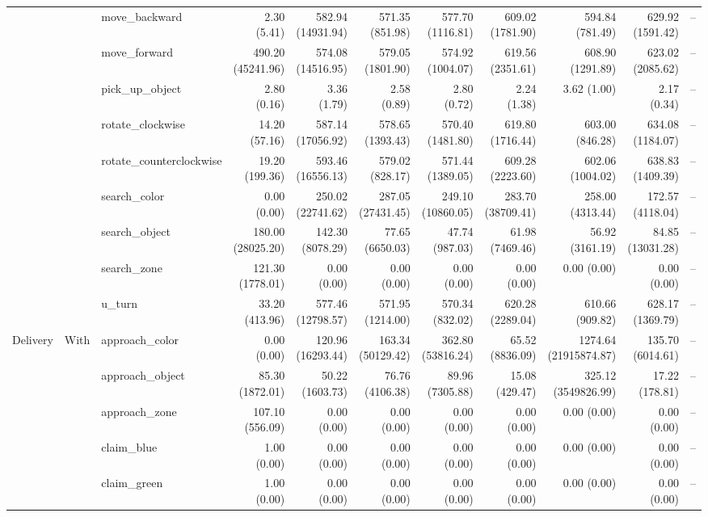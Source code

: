 \begin{table}[t]
{\begin{tabular}{lllrrrrrrrr}
 &  & move\_backward & 2.30 (5.41) & 582.94 (14931.94) & 571.35 (851.98) & 577.70 (1116.81) & 609.02 (1781.90) & 594.84 (781.49) & 629.92 (1591.42) & -- \\
 &  & move\_forward & 490.20 (45241.96) & 574.08 (14516.95) & 579.05 (1801.90) & 574.92 (1004.07) & 619.56 (2351.61) & 608.90 (1291.89) & 623.02 (2085.62) & -- \\
 &  & pick\_up\_object & 2.80 (0.16) & 3.36 (1.79) & 2.58 (0.89) & 2.80 (0.72) & 2.24 (1.38) & 3.62 (1.00) & 2.17 (0.34) & -- \\
 &  & rotate\_clockwise & 14.20 (57.16) & 587.14 (17056.92) & 578.65 (1393.43) & 570.40 (1481.80) & 619.80 (1716.44) & 603.00 (846.28) & 634.08 (1184.07) & -- \\
 &  & rotate\_counterclockwise & 19.20 (199.36) & 593.46 (16556.13) & 579.02 (828.17) & 571.44 (1389.05) & 609.28 (2223.60) & 602.06 (1004.02) & 638.83 (1409.39) & -- \\
 &  & search\_color & 0.00 (0.00) & 250.02 (22741.62) & 287.05 (27431.45) & 249.10 (10860.05) & 283.70 (38709.41) & 258.00 (4313.44) & 172.57 (4118.04) & -- \\
 &  & search\_object & 180.00 (28025.20) & 142.30 (8078.29) & 77.65 (6650.03) & 47.74 (987.03) & 61.98 (7469.46) & 56.92 (3161.19) & 84.85 (13031.28) & -- \\
 &  & search\_zone & 121.30 (1778.01) & 0.00 (0.00) & 0.00 (0.00) & 0.00 (0.00) & 0.00 (0.00) & 0.00 (0.00) & 0.00 (0.00) & -- \\
 &  & u\_turn & 33.20 (413.96) & 577.46 (12798.57) & 571.95 (1214.00) & 570.34 (832.02) & 620.28 (2289.04) & 610.66 (909.82) & 628.17 (1369.79) & -- \\
Delivery & With & approach\_color & 0.00 (0.00) & 120.96 (16293.44) & 163.34 (50129.42) & 362.80 (53816.24) & 65.52 (8836.09) & 1274.64 (21915874.87) & 135.70 (6014.61) & -- \\
 &  & approach\_object & 85.30 (1872.01) & 50.22 (1603.73) & 76.76 (4106.38) & 89.96 (7305.88) & 15.08 (429.47) & 325.12 (3549826.99) & 17.22 (178.81) & -- \\
 &  & approach\_zone & 107.10 (556.09) & 0.00 (0.00) & 0.00 (0.00) & 0.00 (0.00) & 0.00 (0.00) & 0.00 (0.00) & 0.00 (0.00) & -- \\
 &  & claim\_blue & 1.00 (0.00) & 0.00 (0.00) & 0.00 (0.00) & 0.00 (0.00) & 0.00 (0.00) & 0.00 (0.00) & 0.00 (0.00) & -- \\
 &  & claim\_green & 1.00 (0.00) & 0.00 (0.00) & 0.00 (0.00) & 0.00 (0.00) & 0.00 (0.00) & 0.00 (0.00) & 0.00 (0.00) & -- \\

\end{tabular}}
\end{table}
